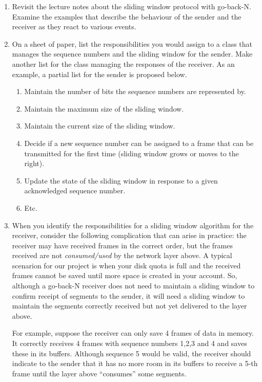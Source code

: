 \documentclass[12pt]{book}
\begin{document}
\begin{enumerate}[label=Activity \arabic*:, ref=\arabic*]
\item Revisit the lecture notes about the sliding window protocol with go-back-N. Examine the examples that describe the behaviour of the sender and the receiver as they react to various events. 

\item On a sheet of paper, list the responsibilities you would assign to a class that manages the sequence numbers and the sliding window for the sender. Make another list for the class managing the responses of the receiver. As an example, a partial list for the sender is proposed below.

  \begin{enumerate}[label=R\arabic*.]
  \item Maintain the number of bits the sequence numbers are represented by.
  \item Maintain the maximum size of the sliding window.
  \item Maintain the current size of the sliding window.
  \item Decide if a new sequence number can be assigned to a frame that can be transmitted for the first time (sliding window grows or moves to the right).
  \item Update the state of the sliding window in response to a given  acknowledged sequence number.
  \item Etc.
  \end{enumerate}

\item When you identify the responsibilities for a sliding window algorithm for the receiver, consider the following complication that can arise in practice:  the receiver may have received frames in the correct order, but the frames received are not \emph{consumed/used} by the network layer above. A typical scenarion for our project is when your disk quota is full and the received frames cannot be saved until more space is created in your account. So, although a go-back-N receiver does not need to maintain a sliding window to confirm receipt of segments to the sender, it will need a sliding window to maintain the segments correctly received but not yet delivered to the layer above.

    For example, suppose the receiver can only save 4 frames of data in memory. It correctly receives 4 frames with sequence numbers 1,2,3 and 4 and saves these in its buffers. Although sequence 5 would be valid, the receiver should indicate to the sender that it has no more room in its buffers to receive a 5-th frame until the layer above ``consumes'' some segments. 
  

\end{enumerate}
\end{document}
